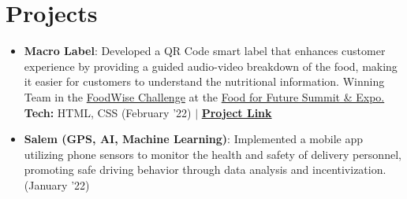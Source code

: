 \documentclass[a4paper,20pt]{article}
\newcommand{\resumeItem}[2]{
  \item\small{
	\textbf{#1}{: #2 \vspace{-2pt}}
  }
}
\newcommand{\resumeSubItem}[2]{\resumeItem{#1}{#2}\vspace{-3pt}}
\newcommand{\resumeSubHeadingListStart}{\begin{itemize}[leftmargin=*]}
\newcommand{\resumeSubHeadingListEnd}{\end{itemize}}
\begin{document}
\section{Projects}
\resumeSubHeadingListStart
\resumeSubItem{Macro Label}{Developed a QR Code smart label that enhances customer experience by providing a guided audio-video breakdown of the food, making it easier for customers to understand the nutritional information. Winning Team in the \href{https://www.foodforfuturesummit.com/foodwise}{FoodWise Challenge} at the \href{https://www.foodforfuturesummit.com/}{Food for Future Summit \& Expo.} \textbf{Tech:} HTML, CSS (February '22) $\vert$ \href{https://github.com/cr2007/foodqrcode}{\textbf{Project Link}}}
\vspace{2pt}
\resumeSubItem{Salem (GPS, AI, Machine Learning)}{Implemented a mobile app utilizing phone sensors to monitor the health and safety of delivery personnel, promoting safe driving behavior through data analysis and incentivization. (January '22)}
\vspace{2pt}
\resumeSubHeadingListEnd
\vspace{-5pt}
\end{document}
